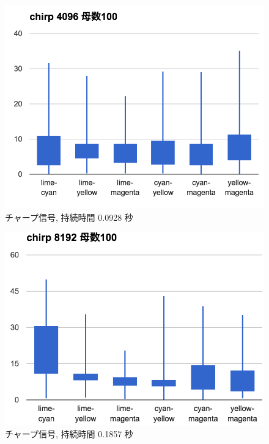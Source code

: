 \begin{figure}[p]
  \centering
  \includegraphics[clip,width=1.05\hsize]{img/c4096.png}
  \caption{チャープ信号, 持続時間 0.0928 秒}\label{fig:c4096}
\end{figure}

\begin{figure}[p]
  \centering
  \includegraphics[clip,width=1.05\hsize]{img/c8192.png}
  \caption{チャープ信号, 持続時間 0.1857 秒}\label{fig:c8192}
\end{figure}

